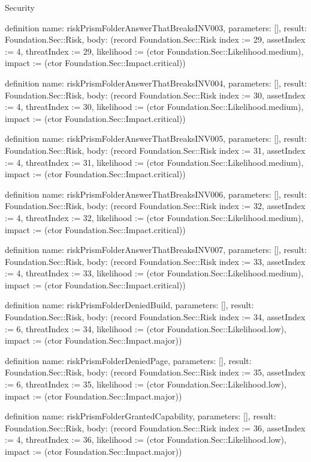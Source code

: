 \begin{lexlean}{Security}
\begin{semanticmodule}
definition{
  name: riskPrismFolderAnswerThatBreaksINV003,
  parameters: [],
  result: Foundation.Sec::Risk,
  body: (record Foundation.Sec::Risk {index := 29, assetIndex := 4, threatIndex := 29, likelihood := (ctor Foundation.Sec::Likelihood.medium), impact := (ctor Foundation.Sec::Impact.critical)})
}

definition{
  name: riskPrismFolderAnswerThatBreaksINV004,
  parameters: [],
  result: Foundation.Sec::Risk,
  body: (record Foundation.Sec::Risk {index := 30, assetIndex := 4, threatIndex := 30, likelihood := (ctor Foundation.Sec::Likelihood.medium), impact := (ctor Foundation.Sec::Impact.critical)})
}

definition{
  name: riskPrismFolderAnswerThatBreaksINV005,
  parameters: [],
  result: Foundation.Sec::Risk,
  body: (record Foundation.Sec::Risk {index := 31, assetIndex := 4, threatIndex := 31, likelihood := (ctor Foundation.Sec::Likelihood.medium), impact := (ctor Foundation.Sec::Impact.critical)})
}

definition{
  name: riskPrismFolderAnswerThatBreaksINV006,
  parameters: [],
  result: Foundation.Sec::Risk,
  body: (record Foundation.Sec::Risk {index := 32, assetIndex := 4, threatIndex := 32, likelihood := (ctor Foundation.Sec::Likelihood.medium), impact := (ctor Foundation.Sec::Impact.critical)})
}

definition{
  name: riskPrismFolderAnswerThatBreaksINV007,
  parameters: [],
  result: Foundation.Sec::Risk,
  body: (record Foundation.Sec::Risk {index := 33, assetIndex := 4, threatIndex := 33, likelihood := (ctor Foundation.Sec::Likelihood.medium), impact := (ctor Foundation.Sec::Impact.critical)})
}

definition{
  name: riskPrismFolderDeniedBuild,
  parameters: [],
  result: Foundation.Sec::Risk,
  body: (record Foundation.Sec::Risk {index := 34, assetIndex := 6, threatIndex := 34, likelihood := (ctor Foundation.Sec::Likelihood.low), impact := (ctor Foundation.Sec::Impact.major)})
}

definition{
  name: riskPrismFolderDeniedPage,
  parameters: [],
  result: Foundation.Sec::Risk,
  body: (record Foundation.Sec::Risk {index := 35, assetIndex := 6, threatIndex := 35, likelihood := (ctor Foundation.Sec::Likelihood.low), impact := (ctor Foundation.Sec::Impact.major)})
}

definition{
  name: riskPrismFolderGrantedCapability,
  parameters: [],
  result: Foundation.Sec::Risk,
  body: (record Foundation.Sec::Risk {index := 36, assetIndex := 4, threatIndex := 36, likelihood := (ctor Foundation.Sec::Likelihood.low), impact := (ctor Foundation.Sec::Impact.major)})
}


\end{semanticmodule}
\end{lexlean}
